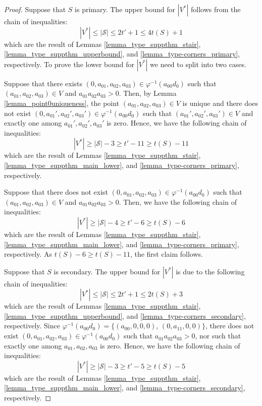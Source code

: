 \documentclass[12pt]{article}
\theoremstyle{remark}
\begin{document}
\begin{proof}
    Suppose that $S$ is primary. The upper bound for $|V^*|$ follows from the chain of inequalities:
    \begin{equation}
        |V^*| \leq |\mathcal{S}| \leq 2 t' + 1 \leq 4 t(S) +1
    \end{equation}
    which are the result of Lemmas \ref{lemma_type_suppthm_stair}, \ref{lemma_type_suppthm_upperbound}, and \ref{lemma_type-corners_primary}, respectively. To prove the lower bound for $|V^*|$ we need to split into two cases.

    Suppose that there exists $(0,a_{01},a_{02},a_{03}) \in \varphi^{-1}(a_{00}d_0)$ such that $(a_{01},a_{02},a_{03}) \in V$ and $a_{01} a_{02} a_{03} > 0$. Then, by Lemma \ref{lemma_point0uniqueness}, the point $(a_{01},a_{02},a_{03}) \in V$ is unique and there does not exist $(0,a_{01}',a_{02}',a_{03}') \in \varphi^{-1}(a_{00}d_0)$ such that $(a_{01}',a_{02}',a_{03}') \in V$ and exactly one among $a_{01}', a_{02}', a_{03}'$ is zero. Hence, we have the following chain of inequalities: 
    \begin{equation}
        |V^*| \geq |\mathcal{S}|-3 \geq t' - 11 \geq t(S) - 11
    \end{equation}
    which are the result of Lemmas \ref{lemma_type_suppthm_stair}, \ref{lemma_type_suppthm_main_lower}, and \ref{lemma_type-corners_primary}, respectively.

    Suppose that there does not exist $(0,a_{01},a_{02},a_{03}) \in \varphi^{-1}(a_{00}d_0)$ such that $(a_{01},a_{02},a_{03}) \in V$ and $a_{01} a_{02} a_{03} > 0$. Then, we have the following chain of inequalities: 
    \begin{equation}
        |V^*| \geq |\mathcal{S}|-4 \geq t' - 6 \geq t(S) - 6
    \end{equation}
    which are the result of Lemmas \ref{lemma_type_suppthm_stair}, \ref{lemma_type_suppthm_main_lower}, and \ref{lemma_type-corners_primary}, respectively. As $t(S) - 6 \geq t(S) - 11$, the first claim follows. 


    Suppose that $S$ is secondary. The upper bound for $|V^*|$ is due to the following chain of inequalities:
    \begin{equation}
        |V^*| \leq |\mathcal{S}| \leq 2 t' + 1 \leq 2 t(S) +3
    \end{equation}
    which are the result of Lemmas \ref{lemma_type_suppthm_stair}, \ref{lemma_type_suppthm_upperbound}, and \ref{lemma_type-corners_secondary}, respectively. Since $\varphi^{-1}(a_{00}d_0) = \{(a_{00},0,0,0)$, $(0,a_{11},0,0)\}$, there does not exist $(0,a_{01},a_{02},a_{03}) \in \varphi^{-1}(a_{00}d_0)$ such that $a_{01} a_{02} a_{03} > 0$, nor such that exactly one among $a_{01}, a_{02}, a_{03}$ is zero. Hence, we have the following chain of inequalities: 
    \begin{equation}
        |V^*| \geq |\mathcal{S}|-3 \geq t' -5 \geq t(S) - 5
    \end{equation} 
    which are the result of Lemmas \ref{lemma_type_suppthm_stair}, \ref{lemma_type_suppthm_main_lower}, and \ref{lemma_type-corners_secondary}, respectively.
\end{proof}
\end{document}

